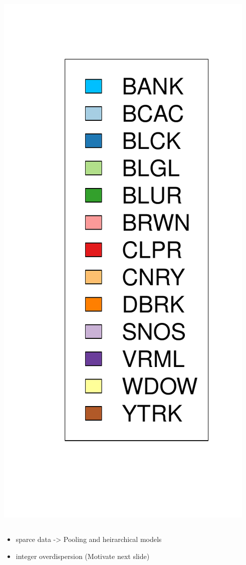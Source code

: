 \documentclass[ xcolor = pdftex, dvipsnames, table ]{beamer}
\begin{document}
\begin{frame}
\includegraphics[height=\textheight]{../pictures/barplotLegend.pdf}
\end{frame}

%
%

%
\subsection{}
\begin{frame}
{\color{red}
\begin{itemize}
\item sparce data -> Pooling and heirarchical models
\item integer overdispersion (Motivate next slide)
\end{itemize}
}
\end{frame}
\end{document}
